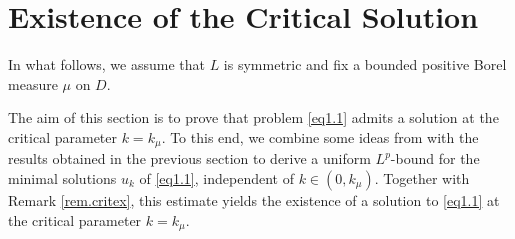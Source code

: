\documentclass[11pt,a4paper,reqno]{amsart}
\theoremstyle{definition}
\numberwithin{equation}{section}
\begin{document}
\section{Existence  of the Critical  Solution}\label{critical-parameter}
\label{sec9}

In what follows, we assume that $L$ is symmetric and fix a bounded positive Borel measure $\mu$ on $D$.

The aim of this section is to prove that problem \eqref{eq1.1} admits a   solution at the critical parameter $k=k_\mu$.
To this end, we combine some ideas from \cite{lit:FerreroSaccon2006} with the results obtained in the previous section to derive a uniform $L^p$-bound
for the minimal solutions $u_k$ of \eqref{eq1.1}, independent of $k\in(0,k_\mu)$. Together with Remark \ref{rem.critex}, 
this estimate yields the existence of a solution to \eqref{eq1.1} at the critical parameter $k=k_\mu$.

 
\end{document}
